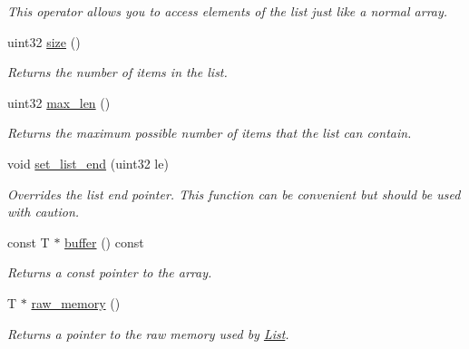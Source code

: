 \begin{DoxyCompactItemize}
\begin{DoxyCompactList}\small\item\em This operator allows you to access elements of the list just like a normal array. \end{DoxyCompactList}\item 
\hypertarget{classetk_1_1_list_aa69eac1c25dcbdedff7f5ce2b7fcaff1}{uint32 \hyperlink{classetk_1_1_list_aa69eac1c25dcbdedff7f5ce2b7fcaff1}{size} ()}\label{classetk_1_1_list_aa69eac1c25dcbdedff7f5ce2b7fcaff1}

\begin{DoxyCompactList}\small\item\em Returns the number of items in the list. \end{DoxyCompactList}\item 
\hypertarget{classetk_1_1_list_af38a32c25ece381c033d9013141a0f12}{uint32 \hyperlink{classetk_1_1_list_af38a32c25ece381c033d9013141a0f12}{max\-\_\-len} ()}\label{classetk_1_1_list_af38a32c25ece381c033d9013141a0f12}

\begin{DoxyCompactList}\small\item\em Returns the maximum possible number of items that the list can contain. \end{DoxyCompactList}\item 
\hypertarget{classetk_1_1_list_ae5ff761960ef80143162ac2d4cd6a456}{void \hyperlink{classetk_1_1_list_ae5ff761960ef80143162ac2d4cd6a456}{set\-\_\-list\-\_\-end} (uint32 le)}\label{classetk_1_1_list_ae5ff761960ef80143162ac2d4cd6a456}

\begin{DoxyCompactList}\small\item\em Overrides the list end pointer. This function can be convenient but should be used with caution. \end{DoxyCompactList}\item 
\hypertarget{classetk_1_1_list_a765da91f522c96c94efec3790b5a63b5}{const T $\ast$ \hyperlink{classetk_1_1_list_a765da91f522c96c94efec3790b5a63b5}{buffer} () const }\label{classetk_1_1_list_a765da91f522c96c94efec3790b5a63b5}

\begin{DoxyCompactList}\small\item\em Returns a const pointer to the array. \end{DoxyCompactList}\item 
\hypertarget{classetk_1_1_list_add87c29d6b7283b6329a01c3b1eae898}{T $\ast$ \hyperlink{classetk_1_1_list_add87c29d6b7283b6329a01c3b1eae898}{raw\-\_\-memory} ()}\label{classetk_1_1_list_add87c29d6b7283b6329a01c3b1eae898}

\begin{DoxyCompactList}\small\item\em Returns a pointer to the raw memory used by \hyperlink{classetk_1_1_list}{List}. \end{DoxyCompactList}\end{DoxyCompactItemize}


